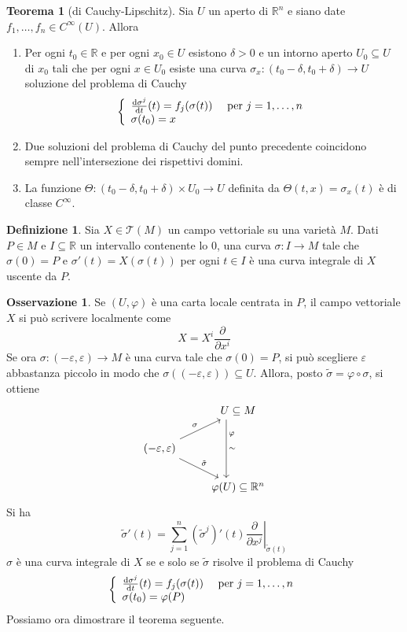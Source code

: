 \documentclass[a4paper,11pt]{article}
\theoremstyle{definition}
\newtheorem{osservazione}{Osservazione}[section]
\newtheorem{definizione}{Definizione}[section]
\theoremstyle{theorem}
\newtheorem{teorema}{Teorema}[section]
\begin{document}
\begin{teorema}[di Cauchy-Lipschitz]
	\label{cauchylipschitz}
	Sia $U$ un aperto di $\mathbb{R}^n$ e siano date $f_1,\dots,f_n\in C^\infty(U)$. Allora
	\begin{enumerate}
		\item Per ogni $t_0\in\mathbb{R}$ e per ogni $x_0\in U$ esistono $\delta>0$ e un intorno aperto $U_0\subseteq U$ di $x_0$ tali che per ogni $x\in U_0$ esiste una curva $\sigma_x\colon(t_0-\delta,t_0+\delta)\to U$ soluzione del problema di Cauchy
		\[\left\{\begin{array}{l l}
		\frac{\mathrm{d}\sigma^j}{\mathrm{d}t}(t)=f_j(\sigma(t))&\textrm{ per $j=1,\dots,n$}\\
		\sigma(t_0)=x&\\
		\end{array}\right.\]
		\item Due soluzioni del problema di Cauchy del punto precedente coincidono sempre nell'intersezione dei rispettivi domini.
		\item La funzione $\Theta\colon(t_0-\delta,t_0+\delta)\times U_0\to U$ definita da $\Theta(t,x)=\sigma_x(t)$ è di classe $C^\infty$.
	\end{enumerate}
\end{teorema}
\begin{definizione}
	Sia $X\in\mathcal{T}(M)$ un campo vettoriale su una varietà $M$. Dati $P\in M$ e $I\subseteq\mathbb{R}$ un intervallo contenente lo 0, una curva $\sigma\colon I\to M$ tale che $\sigma(0)=P$ e $\sigma'(t)=X(\sigma(t))$ per ogni $t\in I$ è una curva integrale di $X$ uscente da $P$.
\end{definizione}
\begin{osservazione}
	Se $(U,\varphi)$ è una carta locale centrata in $P$, il campo vettoriale $X$ si può scrivere localmente come 
	\[X=X^i\frac{\partial}{\partial x^i}\]
	Se ora $\sigma\colon(-\varepsilon,\varepsilon)\to M$ è una curva tale che $\sigma(0)=P$, si può scegliere $\varepsilon$ abbastanza piccolo in modo che $\sigma((-\varepsilon,\varepsilon))\subseteq U$. Allora, posto $\tilde{\sigma}=\varphi\circ\sigma$, si ottiene 
	\[\begin{tikzcd}
	& U\subseteq M \arrow[dd, "\sim", "\varphi" near start, shift right=2.5ex] \\
	(-\varepsilon,\varepsilon)\arrow[ur, "\sigma"]\arrow[dr, "\tilde{\sigma}"] & \\
	& \varphi(U)\subseteq \mathbb{R}^n
	\end{tikzcd}\]
	Si ha
	\[\tilde{\sigma}'(t)=\sum_{j=1}^{n}\left(\tilde{\sigma}^j\right)'(t)\left.\frac{\partial}{\partial x^j}\right|_{\tilde{\sigma}(t)}\]
	$\sigma$ è una curva integrale di $X$ se e solo se $\tilde{\sigma}$ risolve il problema di Cauchy
	\[\left\{\begin{array}{l l}
	\frac{\mathrm{d}\sigma^j}{\mathrm{d}t}(t)=f_j(\sigma(t))&\textrm{ per $j=1,\dots,n$}\\
	\sigma(t_0)=\varphi(P)&\\
	\end{array}\right.\]
	Possiamo ora dimostrare il teorema seguente.
\end{osservazione}
\end{document}
